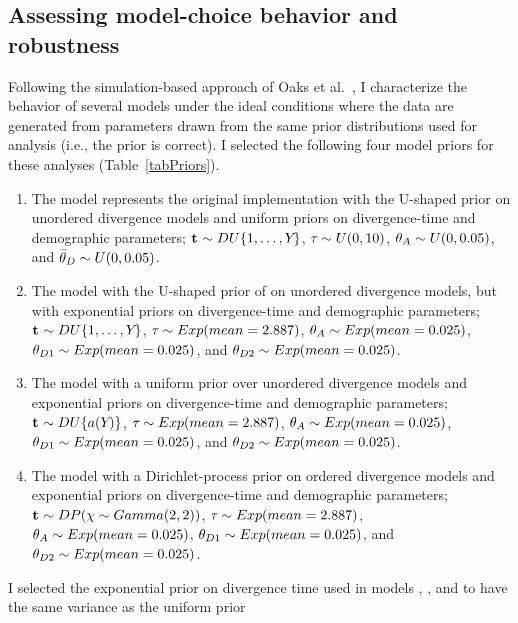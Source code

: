 \subsection{Assessing model-choice behavior and robustness}
Following the simulation-based approach of Oaks et al.\ \cite{Oaks2012}, I
characterize the behavior of several models under the ideal conditions where
the data are generated from parameters drawn from the same prior distributions
used for analysis (i.e., the prior is correct).
I selected the following four model priors for these analyses
(Table~\ref{tabPriors}).
\begin{enumerate}
    \item The \modelOld model represents the original \msb implementation with
        the U-shaped prior on unordered divergence models and uniform priors on
        divergence-time and demographic parameters; $\mathbf{t_{}} \sim
        DU\{1, \ldots, Y_{}\}$, $\tau_{} \sim U(0,10)$, $\ancestralTheta{} \sim U(0,
        0.05)$, and $\descendantThetaMean{} \sim U(0, 0.05)$.
    \item The \modelUshaped model with the U-shaped prior of \msb on unordered
        divergence models, but with exponential priors on divergence-time and
        demographic parameters; $\mathbf{t_{}} \sim DU\{1, \ldots, Y_{}\}$,
        $\tau_{} \sim Exp(mean=2.887)$, $\ancestralTheta{} \sim
        Exp(mean=0.025)$, $\descendantTheta{1}{} \sim Exp(mean=0.025)$, and
        $\descendantTheta{2}{} \sim Exp(mean=0.025)$.
    \item The \modelUniform model with a uniform prior over unordered
        divergence models and exponential priors on divergence-time and
        demographic parameters; $\mathbf{t_{}} \sim DU\{a({Y_{}})\}$,
        $\tau_{} \sim Exp(mean=2.887)$, $\ancestralTheta{} \sim
        Exp(mean=0.025)$, $\descendantTheta{1}{} \sim Exp(mean=0.025)$, and
        $\descendantTheta{2}{} \sim Exp(mean=0.025)$.
    \item The \modelDPP model with a Dirichlet-process prior on ordered
        divergence models and exponential priors on divergence-time and
        demographic parameters; $\mathbf{t_{}} \sim DP(\chi \sim
        Gamma(2,2))$, $\tau_{} \sim Exp(mean=2.887)$, $\ancestralTheta{}
        \sim Exp(mean=0.025)$, $\descendantTheta{1}{} \sim Exp(mean=0.025)$,
        and $\descendantTheta{2}{} \sim Exp(mean=0.025)$.
\end{enumerate}
I selected the exponential prior on divergence time used in models \modelDPP,
\modelUniform, and \modelUshaped to have the same variance as the uniform prior
